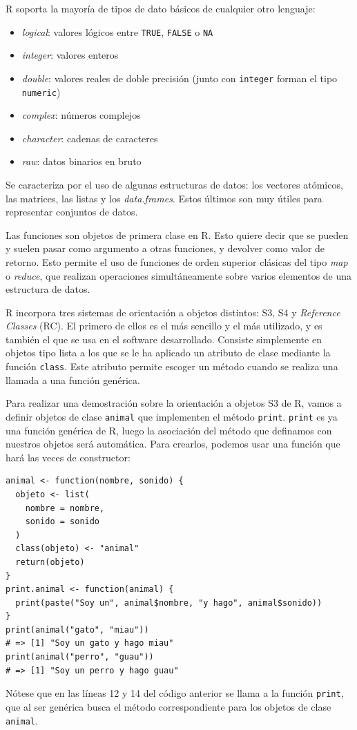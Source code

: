 R soporta la mayoría de tipos de dato básicos de cualquier otro lenguaje:
\begin{itemize}
\item \textit{logical}: valores lógicos entre \texttt{TRUE}, \texttt{FALSE} o \texttt{NA}
\item \textit{integer}: valores enteros
\item \textit{double}: valores reales de doble precisión (junto con \texttt{integer} forman el tipo \texttt{numeric})
\item \textit{complex}: números complejos
\item \textit{character}: cadenas de caracteres
\item \textit{raw}: datos binarios en bruto
\end{itemize}

Se caracteriza por el uso de algunas estructuras de datos: los vectores atómicos, las matrices, las listas y los \textit{data.frames}. Estos últimos son muy útiles para representar conjuntos de datos.

Las funciones son objetos de primera clase en R. Esto quiere decir que se pueden y suelen pasar como argumento a otras funciones, y devolver como valor de retorno. Esto permite el uso de funciones de orden superior clásicas del tipo \textit{map} o \textit{reduce}, que realizan operaciones simultáneamente sobre varios elementos de una estructura de datos.

R incorpora tres sistemas de orientación a objetos distintos: S3, S4 y \textit{Reference Classes} (RC). El primero de ellos es el más sencillo y el más utilizado, y es también el que se usa en el software desarrollado. Consiste simplemente en objetos tipo lista a los que se le ha aplicado un atributo de clase mediante la función \texttt{class}. Este atributo permite escoger un método cuando se realiza una llamada a una función genérica.

\begin{example}
  Para realizar una demostración sobre la orientación a objetos S3 de R, vamos a definir objetos de clase \texttt{animal} que implementen el método \texttt{print}. \texttt{print} es ya una función genérica de R, luego la asociación del método que definamos con nuestros objetos será automática. Para crearlos, podemos usar una función que hará las veces de constructor:
  \begin{lstlisting}
animal <- function(nombre, sonido) {
  objeto <- list(
    nombre = nombre,
    sonido = sonido
  )
  class(objeto) <- "animal"
  return(objeto)
}
print.animal <- function(animal) {
  print(paste("Soy un", animal$nombre, "y hago", animal$sonido))
}
print(animal("gato", "miau"))
# => [1] "Soy un gato y hago miau"
print(animal("perro", "guau"))
# => [1] "Soy un perro y hago guau"
\end{lstlisting}

Nótese que en las líneas 12 y 14 del código anterior se llama a la función \texttt{print}, que al ser genérica busca el método correspondiente para los objetos de clase \texttt{animal}.
\end{example}

